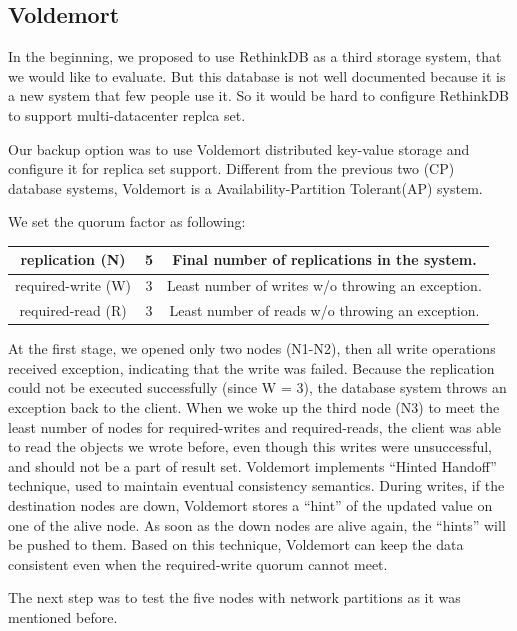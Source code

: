 \documentclass[a4paper]{article}
\begin{document}
\subsection{Voldemort}

In the beginning, we proposed to use RethinkDB as a third storage system, that we would like to evaluate. But this database is not well documented because it is a new system that few people use it. So it would be hard to configure RethinkDB to support multi-datacenter replca set.

Our backup option was to use Voldemort distributed key-value storage and configure it for replica set support. Different from the previous two (CP) database systems, Voldemort is a Availability-Partition Tolerant(AP) system. 

We set the quorum factor as following:

\begin{table}[hb]
  \centering
  \begin{tabular}{|c|c|c|}
    \hline
    replication (N) & 5 & Final number of replications in the system. \\
    \hline
    required-write (W) & 3 & Least number of writes w/o throwing an exception. \\
    \hline
    required-read (R) & 3 & Least number of reads w/o throwing an exception. \\
    \hline
  \end{tabular}
\end{table}

At the first stage, we opened only two nodes (N1-N2), then all write operations received exception, indicating that the write was failed. 
Because the replication could not be executed successfully (since W = 3), the database system throws an exception back to the client. 
When we woke up the third node (N3) to meet the least number of nodes for required-writes and required-reads, the client was able to read the objects we wrote before, even though this writes were unsuccessful, and should not be a part of result set. 
Voldemort implements ``Hinted Handoff'' technique, used to maintain eventual consistency semantics. 
During writes, if the destination nodes are down, Voldemort stores a ``hint'' of the updated value on one of the alive node. 
As soon as the down nodes are alive again, the ``hints'' will be pushed to them. 
Based on this technique, Voldemort can keep the data consistent even when the required-write quorum cannot meet.

The next step was to test the five nodes with network partitions as it was mentioned before. 
\end{document}
